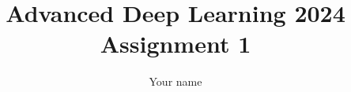 \documentclass[12pt,a4paper]{article}
\begin{document}
\title{Advanced Deep Learning 2024\\Assignment 1}
\author{\color{red}Your name}
\maketitle




\end{document}
